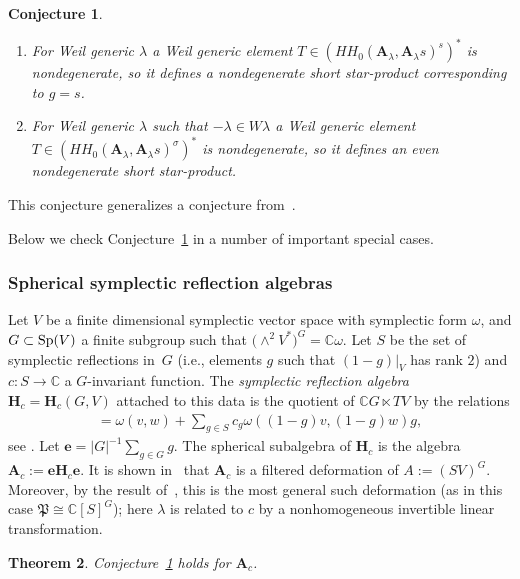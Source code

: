 \documentclass[pdftex]{sigma}
\numberwithin{equation}{section}
\newtheorem{Theorem}{Theorem}[section]
\newtheorem{Conjecture}[Theorem]{Conjecture}
 { \theoremstyle{definition}
\newtheorem{Definition}[Theorem]{Definition}
\newtheorem{Example}[Theorem]{Example}
\newtheorem{Remark}[Theorem]{Remark} }
\begin{document}
\begin{Conjecture}\label{exi} \quad
\begin{enumerate}\itemsep=0pt
\item[$(i)$] For Weil generic $\lambda$ a Weil generic element $T\in (HH_0({\mathbf A}_\lambda,{\mathbf A}_\lambda s)^s)^*$ is nondegenerate, so it defines a nondegenerate short star-product corresponding to $g=s$.
\item[$(ii)$] For Weil generic $\lambda$ such that $-\lambda\in W\lambda$ a Weil generic element $T\in (HH_0({\mathbf A}_\lambda,{\mathbf A}_\lambda s)^\sigma)^*$ is nondegenerate, so it defines
an even nondegenerate short star-product.
\end{enumerate}
\end{Conjecture}

This conjecture generalizes a conjecture from~\cite{BPR}.

Below we check Conjecture~\ref{exi} in a number of important special cases.

\subsubsection{Spherical symplectic reflection algebras}\label{ssra}

Let $V$ be a finite dimensional symplectic vector space with symplectic form $\omega$,
and $G\subset {\rm Sp}(V)$ a finite subgroup such that $\big({\wedge}^2V^*\big)^G={\mathbb C}\omega$.
Let $S$ be the set of symplectic reflections in~$G$ (i.e., elements $g$ such that $(1-g)|_V$ has rank $2$)
and $c\colon S\to {\mathbb C}$ a $G$-invariant function. The {\it symplectic reflection algebra} ${\mathbf{H}}_c={\mathbf{H}}_c(G,V)$ attached to this data is the quotient of ${\mathbb C}G\ltimes TV$ by the relations
\begin{gather*}
[v,w]=\omega(v,w)+\sum_{g\in S}c_g\omega((1-g)v,(1-g)w)g,
\end{gather*}
see \cite{EG}. Let ${\mathbf{e}}=|G|^{-1}\sum\limits_{g\in G}g$. The spherical subalgebra of ${\mathbf{H}}_c$ is the algebra ${\mathbf A}_c:={\mathbf{e}} {\mathbf{H}}_c{\mathbf{e}}$. It is shown in~\cite{EG} that ${\mathbf A}_c$ is a filtered deformation of $A:=(SV)^G$. Moreover, by the result of~\cite{L2}, this is the most general such deformation (as in this case $\mathfrak{P}\cong {\mathbb C}[S]^G$); here $\lambda$ is related to $c$ by a nonhomogeneous invertible linear transformation.

\begin{Theorem} Conjecture~{\rm \ref{exi}} holds for ${\mathbf A}_c$.
\end{Theorem}
\end{document}
